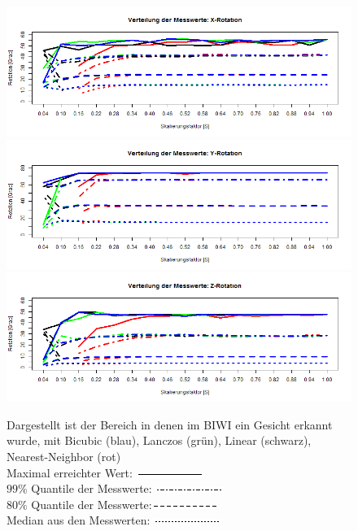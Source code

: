 \begin{figure}
	\centering
	\includegraphics[width=\linewidth]{img_Skalierung/Skal_Max_RX}
	\includegraphics[width=\linewidth]{img_Skalierung/Skal_Max_RY}
	\includegraphics[width=\linewidth]{img_Skalierung/Skal_Max_RZ}
	\caption{Dargestellt ist der Bereich in denen im BIWI \cite{database_Face_Ori} ein Gesicht erkannt wurde, mit Bicubic (blau), Lanczos (grün), Linear (schwarz), Nearest-Neighbor (rot)\\
		Maximal erreichter Wert: \protect\includegraphics[width=0.15\linewidth]{line/Line1}\\
		$99\%$ Quantile der Messwerte: \protect\includegraphics[width=0.15\linewidth]{line/Line4}\\
		$80\%$ Quantile der Messwerte:\protect\includegraphics[width=0.15\linewidth]{line/Line2}\\
		Median aus den Messwerten: \protect\includegraphics[width=0.15\linewidth]{line/Line3}}
	\label{img_Rot_Max}
\end{figure}
